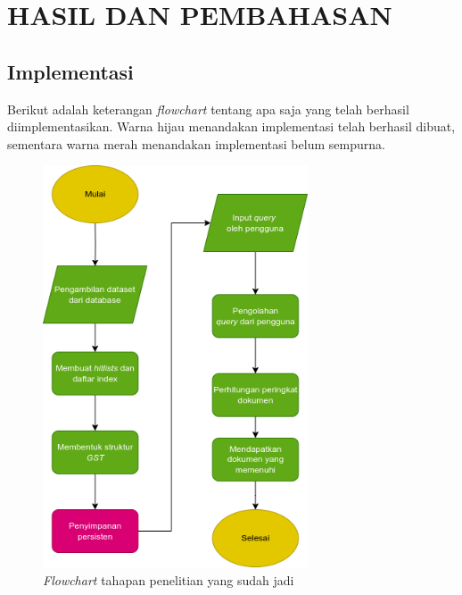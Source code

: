 
\chapter{HASIL DAN PEMBAHASAN}

\section{Implementasi}

Berikut adalah keterangan \textit{flowchart} tentang apa saja yang telah 
berhasil diimplementasikan. Warna hijau menandakan implementasi telah berhasil 
dibuat, sementara warna merah menandakan implementasi belum sempurna.

\begin{figure}[H]
  \centering{}
	\includegraphics[width=0.7\textwidth]{gambar/flowchart_jadi}
  \caption{\textit{Flowchart} tahapan penelitian yang sudah jadi}
\end{figure}

